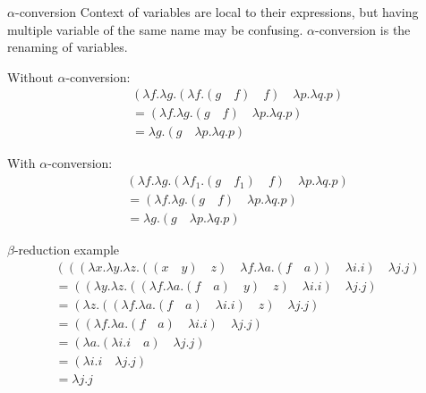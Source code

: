 \documentclass{beamer}
\begin{document}
\begin{frame}{$\alpha$-conversion}
Context of variables are local to their expressions, but having multiple variable of the same name may be confusing. $\alpha$-conversion is the renaming of variables.
    \begin{block}{Without $\alpha$-conversion:}
    \begin{align*}
    &(\lambda f . \lambda g . (\lambda f . (g \quad f) \quad f) \quad \lambda p . \lambda q . p) \\
		&= (\lambda f . \lambda g . (g \quad f ) \quad \lambda p. \lambda q . p) \\
        &= \lambda g . (g \quad \lambda p . \lambda q . p)
    \end{align*}
    \end{block}
    \begin{block}{With $\alpha$-conversion:}
    \begin{align*}
    	& (\lambda f . \lambda g . (\lambda f_1 . (g \quad f_1) \quad f) \quad \lambda p . \lambda q . p) \\
		&= (\lambda f . \lambda g . (g \quad f ) \quad \lambda p. \lambda q . p) \\
        &= \lambda g . (g \quad \lambda p . \lambda q . p)
    \end{align*}
    \end{block}
\end{frame}

\begin{frame}{$\beta$-reduction example}
	\begin{align*}
    	&((( \lambda x . \lambda y . \lambda z . ((x \quad y) \quad z) \quad \lambda f . \lambda a . (f \quad a)) \quad \lambda i . i) \quad \lambda j . j) \\
        &= ((\lambda y . \lambda z . (( \lambda f . \lambda a . (f \quad a) \quad y) \quad z) \quad \lambda i . i) \quad \lambda j . j) \\
        &= (\lambda z . ((\lambda f . \lambda a . (f \quad a) \quad \lambda i . i ) \quad z ) \quad \lambda j . j ) \\
        &= ((\lambda f . \lambda a . (f \quad a ) \quad \lambda i . i ) \quad \lambda j . j) \\
        &= (\lambda a . (\lambda i . i \quad a) \quad \lambda j . j) \\
        &= (\lambda i . i \quad \lambda j .j ) \\
        &= \lambda j . j
    \end{align*}
\end{frame}
\end{document}
